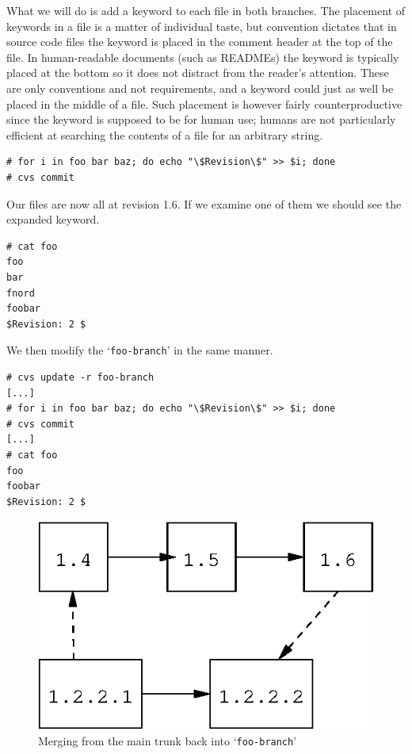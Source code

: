 \documentclass[12pt,letterpaper]{article}
\newcommand{\cmd}[1]{`\texttt{#1}'}
\begin{document}
What we will do is add a keyword to each file in both branches.  The placement
of keywords in a file is a matter of individual taste, but convention dictates
that in source code files the keyword is placed in the comment header at the
top of the file.  In human-readable documents (such as READMEs) the keyword is
typically placed at the bottom so it does not distract from the reader's
attention.  These are only conventions and not requirements, and a keyword
could just as well be placed in the middle of a file.  Such placement is
however fairly counterproductive since the keyword is supposed to be for human
use; humans are not particularly efficient at searching the contents of a file
for an arbitrary string.

\begin{Verbatim}
# for i in foo bar baz; do echo "\$Revision\$" >> $i; done
# cvs commit
\end{Verbatim}

Our files are now all at revision 1.6.  If we examine one of them we should
see the expanded keyword.

\begin{Verbatim}
# cat foo
foo
bar
fnord
foobar
$Revision: 2 $
\end{Verbatim}

We then modify the \cmd{foo-branch} in the same manner.

\begin{Verbatim}
# cvs update -r foo-branch
[...]
# for i in foo bar baz; do echo "\$Revision\$" >> $i; done
# cvs commit
[...]
# cat foo
foo
foobar
$Revision: 2 $
\end{Verbatim}

\begin{figure}[htb]
\begin{center}
\includegraphics{walkthru-kmerge.eps}
\end{center}
\caption{Merging from the main trunk back into \cmd{foo-branch}}
\label{fig:walkthru-kmerge}
\end{figure}
\end{document}
